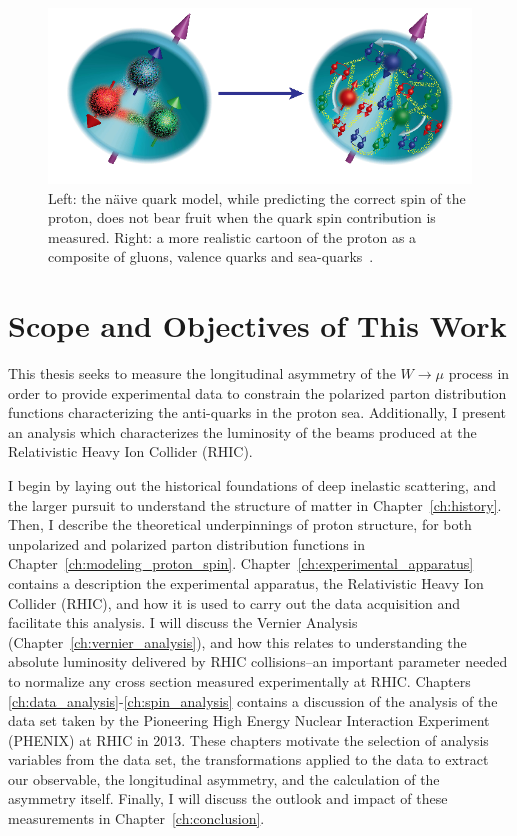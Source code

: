 \begin{figure}
  \centering
  \includegraphics[width=0.8\linewidth]{./figures/figures_introduction_nucleon_picture.png}
  \caption{
    Left: the n{\"a}ive quark model, while predicting the correct spin of the
    proton, does not bear fruit when the quark spin contribution is measured.
    Right: a more realistic cartoon of the proton as a composite of gluons,
    valence quarks and sea-quarks~\cite{Accardi2012}.
  }
  \label{fig:spin_crisis_cartoon}
\end{figure}
 
\section{Scope and Objectives of This Work} 

This thesis seeks to measure the longitudinal asymmetry of the $W\rightarrow\mu$
process in order to provide experimental data to constrain the polarized parton
distribution functions characterizing the anti-quarks in the proton sea.
Additionally, I present an analysis which characterizes the luminosity of the
beams produced at the Relativistic Heavy Ion Collider (RHIC).

I begin by laying out the historical foundations of deep inelastic scattering,
and the larger pursuit to understand the structure of matter in
Chapter~\ref{ch:history}. Then, I describe the theoretical underpinnings of
proton structure, for both unpolarized and polarized parton distribution
functions in Chapter~\ref{ch:modeling_proton_spin}.
Chapter~\ref{ch:experimental_apparatus} contains a description the experimental
apparatus, the Relativistic Heavy Ion Collider (RHIC), and how it is used to
carry out the data acquisition and facilitate this analysis. I will discuss the
Vernier Analysis (Chapter~\ref{ch:vernier_analysis}), and how this relates to
understanding the absolute luminosity delivered by RHIC collisions--an important
parameter needed to normalize any cross section measured experimentally at RHIC.
Chapters \ref{ch:data_analysis}-\ref{ch:spin_analysis} contains a discussion of
the analysis of the data set taken by the Pioneering High Energy Nuclear
Interaction Experiment (PHENIX) at RHIC in 2013.  These chapters motivate the
selection of analysis variables from the data set, the transformations applied
to the data to extract our observable, the longitudinal asymmetry, and the
calculation of the asymmetry itself.  Finally, I will discuss the outlook and
impact of these measurements in Chapter~\ref{ch:conclusion}.
